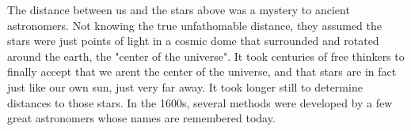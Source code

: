 The distance between us and the stars above was a mystery to ancient 
astronomers. Not knowing the true unfathomable distance, they assumed
the stars were just points of light in a cosmic dome that surrounded
and rotated around the earth, the "center of the universe". It took 
centuries of free thinkers to finally accept that we arent the center 
of the universe, and that stars are in fact just like our own sun, just 
very far away. It took longer still to determine distances to those stars.
In the 1600s, several methods were developed by a few great astronomers 
whose names are remembered today. 